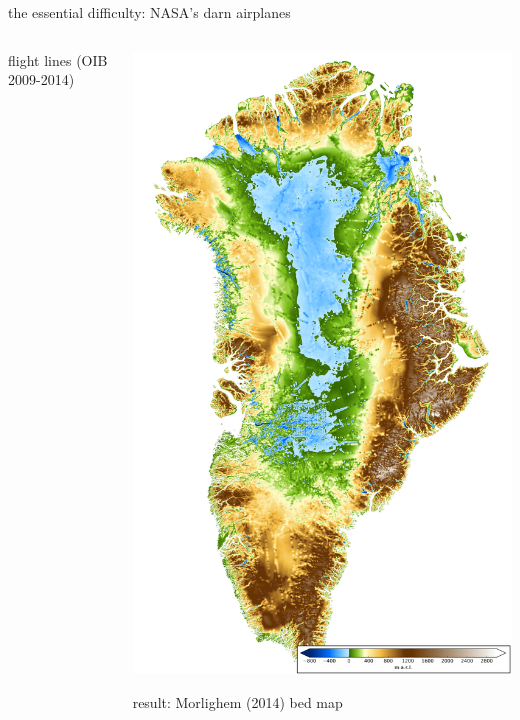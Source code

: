 \documentclass[xcolor={dvipsnames}]{beamer}
\begin{document}
\begin{frame}{the essential difficulty: NASA's darn airplanes}
\begin{columns}
\begin{column}{0.5\textwidth}
\footnotesize \hspace{5mm} flight lines (OIB 2009-2014)
\end{column}
\begin{column}{0.6\textwidth}
\vspace{-8mm}

\hspace{10mm} \includegraphics[height=0.85\textheight,keepaspectratio=true]{scale-greenland-bed-mcb} 

\footnotesize result: Morlighem (2014) bed map
\end{column}
\end{columns}

\end{frame}
\end{document}

